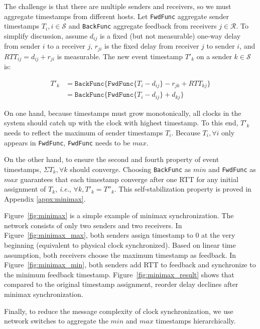 {The challenge is that there are multiple senders and receivers, so we must aggregate timestamps from different hosts.
Let \texttt{FwdFunc} aggregate sender timestamps $T_i, i \in \mathcal{S}$ and \texttt{BackFunc} aggregate feedback from receivers $j \in \mathcal{R}$.
To simplify discussion, assume $d_{ij}$ is a fixed (but not measurable) one-way delay from sender $i$ to a receiver $j$, $r_{ji}$ is the fixed delay from receiver $j$ to sender $i$, and $RTT_{ij} = d_{ij} + r_{ji}$ is measurable.
The new event timestamp $T'_k$ on a sender $k \in \mathcal{S}$ is:

\begin{equation*}
\begin{aligned}
T'_k & = \texttt{BackFunc} \{ \texttt{FwdFunc} \{ T_i - d_{ij} \} - r_{jk} + RTT_{kj} \} \\
     & = \texttt{BackFunc} \{ \texttt{FwdFunc} \{ T_i - d_{ij} \} + d_{kj} \}
\end{aligned}
\end{equation*}

On one hand, because timestamps must grow monotonically, all clocks in the system should catch up with the clock with highest timestamp.
To this end, $T'_k$ needs to reflect the maximum of sender timestamps $T_i$.
Because $T_i, \forall i$ only appears in \texttt{FwdFunc}, \texttt{FwdFunc} needs to be $max$.

On the other hand, to ensure the second and fourth property of event timestamps, $\Sigma T_k, \forall k$ should converge.
Choosing \texttt{BackFunc} as $min$ and \texttt{FwdFunc} as $max$ guarantees that each timestamp converge after one RTT for any initial assignment of $T_k$, \textit{i.e.}, $\forall k, T'_k = T''_k$.
This self-stabilization property is proved in Appendix \ref{appx:minimax}.

Figure~\ref{fig:minimax} is a simple example of minimax synchronization.
The network consists of only two senders and two receivers.
In Figure~\ref{fig:minimax_max}, both senders assign timestamp to $0$ at the very beginning (equivalent to physical clock synchronized).
Based on linear time assumption, both receivers choose the maximum timestamp as feedback.
In Figure~\ref{fig:minimax_min}, both senders add RTT to feedback and synchronize to the minimum feedback timestamp.
Figure~\ref{fig:minimax_result} shows that compared to the original timestamp assignment, reorder delay declines after minimax synchronization.

Finally, to reduce the message complexity of clock synchronization, we use network switches to aggregate the $min$ and $max$ timestamps hierarchically.
\fi

}
